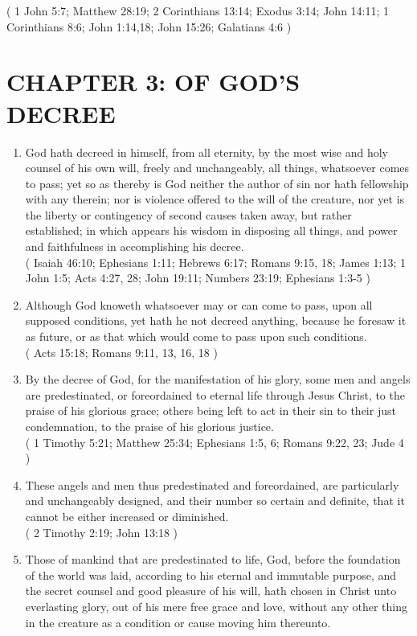 \documentclass[12pt,a4paper]{book}
\begin{document}
\begin{enumerate}
( 1 John 5:7; Matthew 28:19; 2 Corinthians 13:14; Exodus 3:14; John 14:11; 1 Corinthians 8:6; John 1:14,18; John 15:26; Galatians 4:6 )
\end{enumerate}

\chapter{CHAPTER 3: OF GOD'S DECREE}
\label{ch-dec}
\begin{enumerate}
\item God hath decreed in himself, from all eternity, by the most wise and holy counsel of his own will, freely and unchangeably, all things, whatsoever comes to pass; yet so as thereby is God neither the author of sin nor hath fellowship with any therein; nor is violence offered to the will of the creature, nor yet is the liberty or contingency of second causes taken away, but rather established; in which appears his wisdom in disposing all things, and power and faithfulness in accomplishing his decree.\\
( Isaiah 46:10; Ephesians 1:11; Hebrews 6:17; Romans 9:15, 18; James 1:13; 1 John 1:5; Acts 4:27, 28; John 19:11; Numbers 23:19; Ephesians 1:3-5 )
\item Although God knoweth whatsoever may or can come to pass, upon all supposed conditions, yet hath he not decreed anything, because he foresaw it as future, or as that which would come to pass upon such conditions.\\
( Acts 15:18; Romans 9:11, 13, 16, 18 )
\item By the decree of God, for the manifestation of his glory, some men and angels are predestinated, or foreordained to eternal life through Jesus Christ, to the praise of his glorious grace; others being left to act in their sin to their just condemnation, to the praise of his glorious justice.\\
( 1 Timothy 5:21; Matthew 25:34; Ephesians 1:5, 6; Romans 9:22, 23; Jude 4 )
\item These angels and men thus predestinated and foreordained, are particularly and unchangeably designed, and their number so certain and definite, that it cannot be either increased or diminished.\\
( 2 Timothy 2:19; John 13:18 )
\item Those of mankind that are predestinated to life, God, before the foundation of the world was laid, according to his eternal and immutable purpose, and the secret counsel and good pleasure of his will, hath chosen in Christ unto everlasting glory, out of his mere free grace and love, without any other thing in the creature as a condition or cause moving him thereunto.\\

\end{enumerate}
\end{document}
